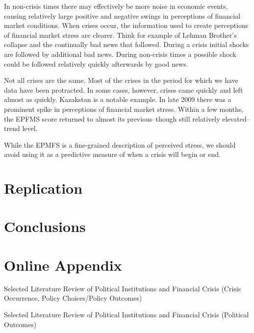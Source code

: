 \documentclass[]{article}
\begin{document}
In non-crisis times there may effectively be more noise in economic events, causing relatively large positive and negative swings in perceptions of financial market conditions. When crises occur, the information used to create perceptions of financial market stress are clearer. Think for example of Lehman Brother's collapse and the continually bad news that followed. During a crisis initial shocks are followed by additional bad news. During non-crisis times a possible shock could be followed relatively quickly afterwards by good news.

Not all crises are the same. Most of the crises in the period for which we have data have been protracted. In some cases, however, crises came quickly and left almost as quickly. Kazakstan is a notable example. In late 2009 there was a prominent spike in perceptions of financial market stress. Within a few months, the EPFMS score returned to almost its previous--though still relatively elevated--trend level.

While the EPMFS is a fine-grained description of perceived stress, we should avoid using it as a predictive measure of when a crisis will begin or end.

\section{Replication}\label{replication}

\section{Conclusions}\label{conclusions}





\clearpage

\section*{Online Appendix}


\begin{table}[H]
\caption{Selected Literature Review of Political Institutions and Financial
Crisis (Crisis Occurrence, Policy Choices/Policy Outcomes)}


\label{LitRevTable}
\begin{center}

\vspace{0.5cm}
{\tiny{

}}
\end{center}
\end{table}


\begin{table}
\caption{Selected Literature Review of Political Institutions and Financial
Crisis (Political Outcomes)}


\label{LitRevTable2}
\begin{center}

\vspace{0.5cm}
\scalebox{0.9}{

}
\end{center}
\end{table}
\end{document}
